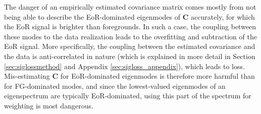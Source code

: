 \documentclass[preprint2,numberedappendix,tighten]{aastex6}  %
\begin{document}

% 








The danger of an empirically estimated covariance matrix comes mostly from not being able to describe the EoR-dominated eigenmodes of $\textbf{C}$ accurately, for which the EoR signal is brighter than foregrounds. In such a case, the coupling between these modes to the data realization leads to the overfitting and subtraction of the EoR signal. More specifically, the coupling between the estimated covariance and the data is anti-correlated in nature (which is explained in more detail in Section \ref{sec:siglossmethod} and Appendix \ref{sec:sigloss_appendix}), which leads to loss. Mis-estimating $\textbf{C}$ for EoR-dominated eigenmodes is therefore more harmful than for FG-dominated modes, and since the lowest-valued eigenmodes of an eigenspectrum are typically EoR-dominated, using this part of the spectrum for weighting is most dangerous.
\end{document}
